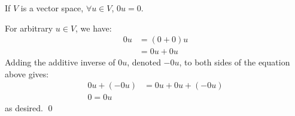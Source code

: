 \begin{theorem}
    If $V$ is a vector space, $\forall u \in V$, $0u = 0$.
    \begin{proof*}
    For arbitrary $u \in V$, we have:
    \begin{align*}
        0u &= (0 + 0)u \\
        &= 0u + 0u
    \end{align*}
    Adding the additive inverse of $0u$, denoted $-0u$, to both sides of the equation
    above gives:
    \begin{align*}
        0u + (-0u) &= 0u + 0u + (-0u) \\
        0 = 0u
    \end{align*}
    as desired. \qed
    \end{proof*}

\end{theorem}



\endinput
